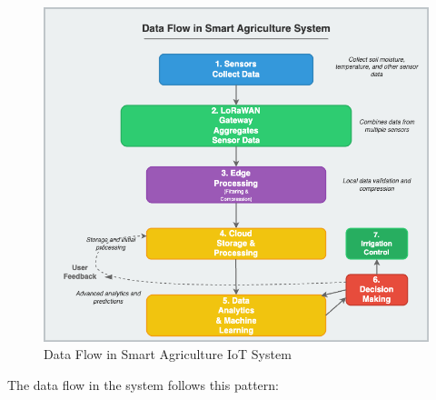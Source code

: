 \documentclass[12pt,a4paper]{article}
\begin{document}
\begin{figure}[H]
\centering
\includegraphics[width=\textwidth]{img/drawio/data_flow.png}
\caption{Data Flow in Smart Agriculture IoT System}
\label{fig:dataflow}
\end{figure}

The data flow in the system follows this pattern:
\end{document}
